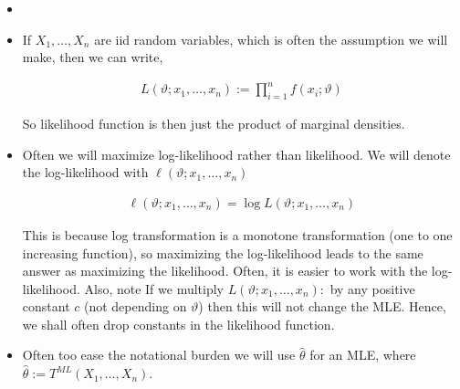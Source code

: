 \documentclass[ 11pt,%
				a4paper,%
				twoside,%
				headinclude,%
				footinclude = true,%
				cleardoublepage = empty,%
				reqno]{scrbook}
\begin{document}
\begin{remarks}

\begin{itemize}
  \item[]

  \item  If $X_{1}, \ldots, X_{n}$ are iid random variables, which is often the assumption we will make, then we can write,

  \begin{align*}
    L(\vartheta ; x_{1}, \ldots, x_{n}):=\prod_{i = 1}^n f(x_{i} ; \vartheta)
  \end{align*} 

  So likelihood function is then just the product of marginal densities.

  \item Often we will maximize log-likelihood rather than likelihood. We will denote the log-likelihood with $\ell(\vartheta; x_1, \ldots, x_n)$

  \begin{align*}
    \ell(\vartheta; x_1, \ldots, x_n) = \log L(\vartheta ; x_{1}, \ldots, x_{n})
  \end{align*}


   This is because log transformation is a monotone transformation (one to one increasing function), so maximizing the log-likelihood leads to the same answer as maximizing the likelihood. Often, it is easier to work with the log-likelihood. Also, note If we multiply $L(\vartheta ; x_{1}, \ldots, x_{n}):$ by any positive constant $c$ (not depending on $\vartheta$) then this will not change the MLE. Hence, we shall often drop constants in the likelihood function.


   \item Often too ease the notational burden we will use $\widehat{\theta}$ for an MLE, where $\widehat{\theta} := T^{ML}(X_1, \ldots, X_n)$. 


\end{itemize}
  
\end{remarks}







\end{document}
